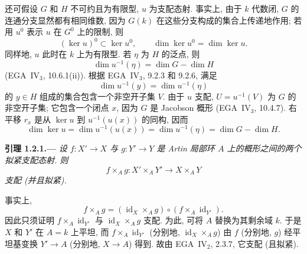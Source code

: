 还可假设 \(G\) 和 \(H\) 不可约且为有限型, \(u\) 为支配态射.
事实上, 由于 \(k\) 代数闭, \(G\) 的连通分支显然都有相同维数,
因为 \(G(k)\) 在这些分支构成的集合上传递地作用;
若用 \(u^0\) 表示 \(u\) 在 \(G^0\) 上的限制, 则
\[
  (\ker u)^0\subset\ker u^0,
  \qquad
  \dim\ker u^0=\dim\ker u.
\]
同样地, \(u\) 此时在 \(k\) 上为有限型.
若 \(\eta\) 为 \(H\) 的泛点, 则
\[
  \dim u^{-1}(\eta)=\dim G-\dim H
\]
(EGA~IV\(_3\), 10.6.1(ii)). 根据 EGA~IV\(_3\), 9.2.3 和 9.2.6,
满足
\[
  \dim u^{-1}(y)=\dim u^{-1}(\eta)
\]
的 \(y\in H\) 组成的集合包含一个非空开子集 \(V\).
由于 \(u\) 支配, \(U=u^{-1}(V)\) 为 \(G\) 的非空开子集;
它包含一个闭点 \(x\), 因为 \(G\) 是 Jacobson 概形
(EGA~IV\(_3\), 10.4.7). 右平移 \(r_x\) 是从 \(\ker u\)
到 \(u^{-1}(u(x))\) 的同构, 因而
\[
  \dim\ker u
    =\dim u^{-1}(u(x))
    =\dim u^{-1}(\eta)
    =\dim G-\dim H.
\]

\medskip
{}\label{lem:sga3-VIB-1.2.1}%
\noindent\textbf{引理 1.2.1.---}
\emph{设 \(f:X'\to X\) 与 \(g:Y'\to Y\) 是 Artin 局部环 \(A\)
上的概形之间的两个拟紧支配态射. 则}
\[
  f\times_Ag:X'\times_A Y'\longrightarrow X\times_A Y
\]
\emph{支配 (并且拟紧).}

事实上,
\[
  f\times_Ag
    =
  (\operatorname{id}_X\times_Ag)
    \circ
  (f\times_A\operatorname{id}_{Y'}).
\]
因此只须证明 \(f\times_A\operatorname{id}_{Y'}\) 与
\(\operatorname{id}_X\times_Ag\) 支配.
为此, 可将 \(A\) 替换为其剩余域 \(k\).
于是 \(X\) 和 \(Y'\) 在 \(A=k\) 上平坦,
而 \(f\times_A\operatorname{id}_{Y'}\)
(分别地, \(\operatorname{id}_X\times_Ag\))
由 \(f\) (分别地, \(g\)) 经平坦基变换 \(Y'\to A\)
(分别地, \(X\to A\)) 得到.
故由 EGA~IV\(_2\), 2.3.7, 它支配 (且拟紧).
